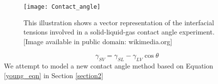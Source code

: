 \begin{figure}
	\centering
	\texttt{[image: Contact\_angle]}
	\caption{This illustration shows a vector representation of the interfacial tensions involved in a solid-liquid-gas contact angle experiment. [Image available in public domain: wikimedia.org]}
	\label{fig:ca-vector}
\end{figure}

\begin{equation}\label{young_eqn}
	\boxed{\gamma_{SV} =\gamma_{SL}-\gamma_{LV}\cos\theta}	
\end{equation}
We attempt to model a new contact angle method based on Equation \ref{young_eqn} in Section \ref{section2}


